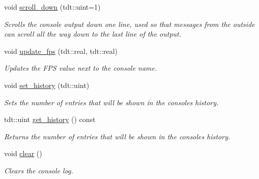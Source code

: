 \begin{DoxyCompactItemize}
void \hyperlink{class_console_a4df392abfe169e86b14826886105b3d0}{scroll\+\_\+down} (tdt\+::uint=1)
\begin{DoxyCompactList}\small\item\em Scrolls the console output down one line, used so that messages from the outside can scroll all the way down to the last line of the output. \end{DoxyCompactList}\item 
void \hyperlink{class_console_ac3fa9f9078ac81af758ad0bec7a10bf8}{update\+\_\+fps} (tdt\+::real, tdt\+::real)
\begin{DoxyCompactList}\small\item\em Updates the F\+PS value next to the console name. \end{DoxyCompactList}\item 
void \hyperlink{class_console_a4af831013fd544d43a8c000663fbac8d}{set\+\_\+history} (tdt\+::uint)
\begin{DoxyCompactList}\small\item\em Sets the number of entries that will be shown in the console\textquotesingle{}s history. \end{DoxyCompactList}\item 
tdt\+::uint \hyperlink{class_console_a15c0773f490a22f1598acdf90f65372e}{get\+\_\+history} () const 
\begin{DoxyCompactList}\small\item\em Returns the number of entries that will be shown in the console\textquotesingle{}s history. \end{DoxyCompactList}\item 
void \hyperlink{class_console_a8b4ffaeabbea48e1f3aa1e535ee88ab8}{clear} ()
\begin{DoxyCompactList}\small\item\em Clears the console log. \end{DoxyCompactList}\end{DoxyCompactItemize}
